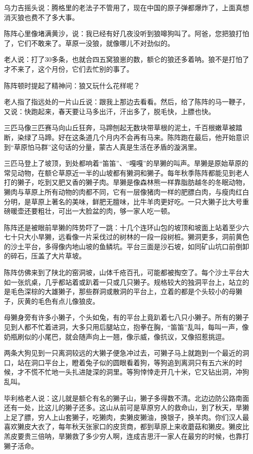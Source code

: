 \par 乌力吉摇头说：腾格里的老法子不管用了，现在中国的原子弹都爆炸了，上面真想消灭狼也费不了多大事。
\par 陈阵心里像堵满黄沙，说：我已经有好几夜没听到狼嗥狗叫了。阿爸，您把狼打怕了，它们不敢来了。草原一没狼，就像哪儿不对劲似的。
\par 老人说：打了30多条，也就合四五窝狼崽的数，额仑的狼还多着呐。狼不是打怕了才不来了，这个月份，它们去忙别的事了。
\par 陈阵顿时提起了精神问：狼又玩什么花样呢？
\par 老人指了指远处的一片山丘说：跟我上那边去看看。然后，给了陈阵的马一鞭子，又说：快跑起来，春天要让马多出汗，汗出多了，脱毛快，上膘也快。
\par 三匹马像三匹赛马向山丘狂奔，马蹄刨起无数块带草根的泥土，千百根嫩草被踏断，染绿了马蹄。好在这条道几个月内不会再有马来。陈阵跑在最后，他开始意识到“草原怕马群”这句话的分量，蒙古人真是生活在矛盾的漩涡里。
\par 
\par 三匹马登上了坡顶，到处都响着“笛笛”、“嘎嘎”的旱獭的叫声。旱獭是原始草原的常见动物，在额仑草原近一半的山坡都有獭洞和獭子。每年秋季陈阵都能见到老人打的獭子，吃到又肥又香的獭子肉。旱獭是像森林熊一样靠脂肪越冬的冬眠动物，獭肉与草原上所有动物的肉都不同，它有一层像猪肉一样的肥膘白肉，与瘦肉红白分明，是草原上著名的美味，鲜肥无膻味，比牛羊肉更好吃。一只大獭子比大号重磅暖壶还要粗壮，可出一大脸盆的肉，够一家人吃一顿。
\par 陈阵还是被眼前旱獭的阵势吓了一跳：十几个连环山包的坡顶和坡面上站着至少六七十只大小旱獭，远看像一片采伐过的树林的一段一段树桩。獭洞更多，洞前黄色的沙土平台，多得像内地山坡的鱼鳞坑。平台三面是沙石坡，如同矿山坑口前倒卸的碎石，压盖了大片草坡。
\par 陈阵仿佛来到了陕北的窑洞坡，山体千疮百孔，可能都被掏空了。每个沙土平台大如一张炕桌，几乎都站着或趴着一只或几只獭子。规格较大的独洞平台上，站立的是毛色深棕的大雄獭子，那些群洞或散洞的平台上，立着的都是个头较小的母獭子，灰黄的毛色有点儿像狼皮。
\par 母獭身旁有许多小獭子，个头如兔，有的平台上竟趴着七八只小獭子。所有的獭子见到人都不忙着进洞，大多只用后腿站立，抱拳在胸，“笛笛”乱叫，每叫一声，像奶瓶刷似的小尾巴，就会随声向上一翘，像示威，像抗议，又像招惹挑逗。
\par 两条大狗见到一只离洞较远的大獭子便急冲过去，可獭子马上就跑到一个最近的洞口，站在洞口平台上，瞪着兔子似的圆眼看着狗，等狗追到离洞只有五六米的时候，才不慌不忙地一头扎进陡深的洞里。等狗悻悻走开几十米，它又钻出洞，冲狗乱叫。
\par 毕利格老人说：这儿就是额仑有名的獭子山，獭子多得数不清。北边边防公路南面还有一处，比这儿的獭子还多。这山从前可是草原穷人的救命山，到了秋天，旱獭上足了膘，穷人上山套獭子，吃獭肉，卖獭皮獭油，换银子，换羊肉。你们汉人最喜欢獭皮大衣了，每年秋天张家口的皮货商，都到草原上来收蘑菇和獭皮。獭皮比羔皮要贵三倍呐，旱獭救了多少穷人啊，连成吉思汗一家人在最穷的时候，也靠打獭子活命。
